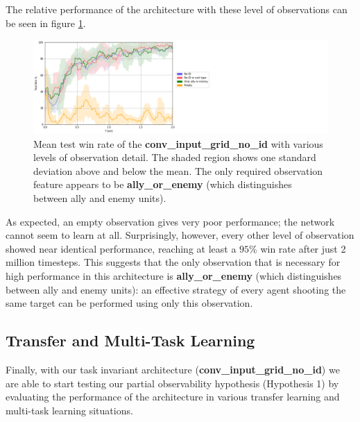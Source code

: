 \vspace{5mm}
The relative performance of the architecture with these level of observations can be seen in figure \ref{fig:obs}. 

\begin{figure}
    \centering
    \hbox{\hspace{5em}\includegraphics[scale=0.5]{images/graphs/obs.png}}
    \caption{Mean test win rate of the \textbf{conv\_input\_grid\_no\_id} with various levels of observation detail. The shaded region shows one standard deviation above and below the mean. The only required observation feature appears to be \textbf{ally\_or\_enemy} (which distinguishes between ally and enemy units).}
    \label{fig:obs}
\end{figure}

As expected, an empty observation gives very poor performance; the network cannot seem to learn at all. Surprisingly, however, every other level of observation showed near identical performance, reaching at least a $95\%$ win rate after just 2 million timesteps. This suggests that the only observation that is necessary for high performance in this architecture is \textbf{ally\_or\_enemy} (which distinguishes between ally and enemy units): an effective strategy of every agent shooting the same target can be performed using only this observation.










\subsection{Transfer and Multi-Task Learning}

Finally, with our task invariant architecture (\textbf{conv\_input\_grid\_no\_id}) we are able to start testing our partial observability hypothesis (Hypothesis 1) by evaluating the performance of the architecture in various transfer learning and multi-task learning situations.


